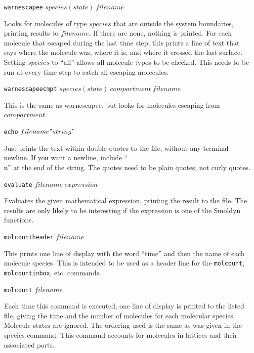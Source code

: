 \documentclass {scrbook}
\newcommand {\ttt} {\texttt}
\begin{document}
\begin{description}

\item{\ttt{warnescapee} $species(state)\ filename$}

Looks for molecules of type $species$ that are outside the system boundaries, printing results to $filename$. If there are none, nothing is printed. For each molecule that escaped during the last time step, this prints a line of text that says where the molecule was, where it is, and where it crossed the last surface. Setting $species$ to ``all'' allows all molecule types to be checked. This needs to be run at every time step to catch all escaping molecules.

\item{\ttt{warnescapeecmpt} $species(state)\ compartment\ filename$}

This is the same as warnescapee, but looks for molecules escaping from $compartment$.

\item{\ttt{echo} $filename "string"$}

Just prints the text within double quotes to the file, without any terminal newline. If you want a newline, include ``\\n'' at the end of the string. The quotes need to be plain quotes, not curly quotes.

\item{\ttt{evaluate} $filename\ expression$}

Evaluates the given mathematical expression, printing the result to the file. The results are only likely to be interesting if the expression is one of the Smoldyn functions.

\item{\ttt{molcountheader} $filename$}

This prints one line of display with the word ``time'' and then the name of each molecule species. This is intended to be used as a header line for the \ttt{molcount}, \ttt{molcountinbox}, etc. commands.

\item{\ttt{molcount} $filename$}

Each time this command is executed, one line of display is printed to the listed file, giving the time and the number of molecules for each molecular species. Molecule states are ignored. The ordering used is the same as was given in the species command. This command accounts for molecules in lattices and their associated ports.


\end{description}
\end{document}
